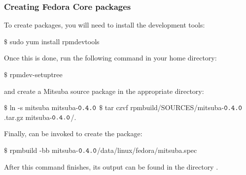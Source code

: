 \subsubsection{Creating Fedora Core packages}
To create  packages, you will need to install the  development tools:
\begin{shell}
$\text{\$}$ sudo yum install rpmdevtools
\end{shell}
Once this is done, run the following command in your home directory:
\begin{shell}
$\text{\$}$ rpmdev-setuptree
\end{shell}
and create a Mitsuba source package in the appropriate directory:
\begin{shell}
$\text{\$}$ ln -s mitsuba mitsuba-$\texttt{0.4.0}$
$\text{\$}$ tar czvf rpmbuild/SOURCES/mitsuba-$\texttt{0.4.0}$.tar.gz mitsuba-$\texttt{0.4.0}$/.
\end{shell}
Finally,  can be invoked to create the package:
\begin{shell}
$\text{\$}$ rpmbuild -bb mitsuba-$\texttt{0.4.0}$/data/linux/fedora/mitsuba.spec
\end{shell}
After this command finishes, its output can be found in the directory .
